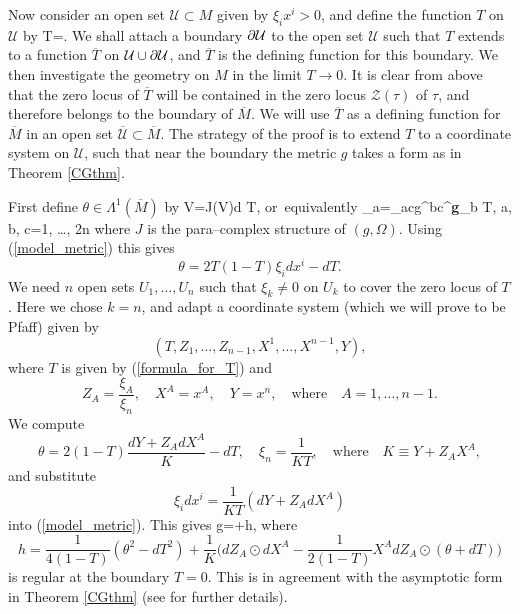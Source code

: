 Now consider an open set  ${\mathcal U}\subset M$ given
by  $\xi_ix^i>0$, and define the function $T$ on ${\mathcal U}$ by
\be
\label{formula_for_T}
T=.
\ee
We shall attach a boundary  $\partial \mathcal{U}$ to the open set $\mathcal{U}$ 
such that $T$ extends to a function $\overline{T}$ on $\mathcal{U}\cup \partial \mathcal{U}$, and
$\overline{T}$ is  the defining function for this boundary.
We then investigate the geometry on $M$ in the limit $T\rightarrow 0$.
It is clear from above that
the zero locus of $\overline{T}$ will be contained in the zero locus $\mathcal{Z}(\tau)$ of $\tau$, and
therefore belongs to the boundary of $\overline{M}$. We will 
use $\overline{T}$ as a defining function for $\overline{M}$ in an open set $\overline{\mathcal{U}}\subset\overline{M}$.
The strategy of the proof is to extend $T$ to a coordinate system on 
$\mathcal{U}$, such that near the boundary the metric $g$ takes a form
as in Theorem \ref{CGthm}.


First define $\theta\in \Lambda^1(\overline{M})$
by 
\be
\label{def_theta}
V\hook \theta=J(V)\hook d T, \quad\mbox{or equivalently}\quad 
\theta_a=\Omega_{ac}g^{bc}{{\nabla}^{\bf g}}_b T, \quad a, b, c=1, \dots, 2n
\ee
where $J$ is the para--complex structure of $(g,  \Omega)$. Using (\ref{model_metric}) this  gives
\[
\theta=2T(1-T)\xi_id x^i-dT.
\]
We need $n$  open sets $U_1, \dots, U_n$ such that $\xi_k\neq 0$ on $U_k$
to cover the zero locus of $T$. Here we chose $k=n$, and adapt
a coordinate system (which we will prove to be Pfaff) given by
\[
(T, Z_1, \dots, Z_{n-1}, X^1, \dots,
 X^{n-1}, Y),
\] 
where $T$ is
given by (\ref{formula_for_T}) and
\[
Z_A=\frac {\xi_A}{\xi_n}, \quad X^A=x^A, \quad Y=x^{n}, \quad\mbox{where}\quad
A=1, \dots, n-1.
\]
We compute
\[
\theta=2(1-T)\frac{dY+Z_AdX^A}{K}-dT, \quad
\xi_n=\frac{1}{KT}, \quad \mbox{where}\quad K\equiv Y+Z_AX^A,
\]
and substitute
\[
\xi_i dx^i=\frac{1}{KT}(dY+Z_AdX^A)
\]
into (\ref{model_metric}). This gives
\be
\label{CG_Form}
g=+h,
\ee
where 
\[
h=\frac{1}{4(1-T)}(\theta^2-dT^2)+\frac{1}{K}\Big(dZ_A\odot dX^A-\frac{1}{2(1-T)}X^A dZ_A\odot(\theta+dT)\Big)
\]
is regular at the boundary $T=0$. This is in agreement with the 
asymptotic form in Theorem \ref{CGthm} (see \cite{CG} for further details).

